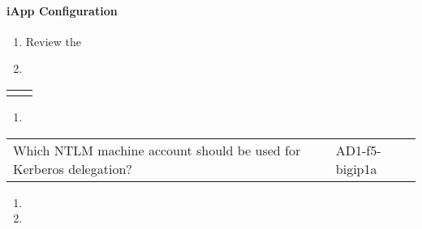 \documentclass[letterpaper,10pt,english]{sphinxmanual}
\begin{document}
\paragraph{iApp Configuration}
\label{\detokenize{class2/module3/lab1:iapp-configuration}}\begin{enumerate}
\item {} 
Review the 

\item {} 

\end{enumerate}


\begin{savenotes}\sphinxattablestart
\centering
\begin{tabulary}{\linewidth}[t]{|T|T|}
\hline
{}\relax &\relax \\
\hline&\\
\hline
\end{tabulary}
\par
\sphinxattableend\end{savenotes}
\begin{enumerate}
\item {} 

\end{enumerate}


\begin{savenotes}\sphinxattablestart
\centering
\begin{tabulary}{\linewidth}[t]{|T|T|}
\hline
{}\relax &\relax \\
\hline
Which NTLM machine account should be used for Kerberos delegation?
&
AD1-f5-bigip1a
\\
\hline
\end{tabulary}
\par
\sphinxattableend\end{savenotes}
\begin{enumerate}
\item {} 

\item {} 

\end{enumerate}
\end{document}
